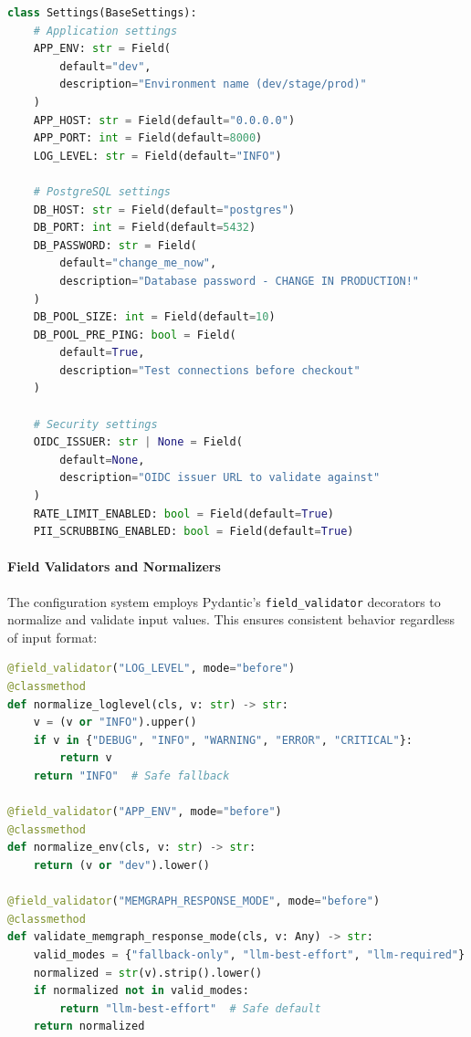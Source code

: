 \begin{lstlisting}[language=Python, caption=Example configuration field definitions from src/config.py]
class Settings(BaseSettings):
    # Application settings
    APP_ENV: str = Field(
        default="dev", 
        description="Environment name (dev/stage/prod)"
    )
    APP_HOST: str = Field(default="0.0.0.0")
    APP_PORT: int = Field(default=8000)
    LOG_LEVEL: str = Field(default="INFO")
    
    # PostgreSQL settings
    DB_HOST: str = Field(default="postgres")
    DB_PORT: int = Field(default=5432)
    DB_PASSWORD: str = Field(
        default="change_me_now", 
        description="Database password - CHANGE IN PRODUCTION!"
    )
    DB_POOL_SIZE: int = Field(default=10)
    DB_POOL_PRE_PING: bool = Field(
        default=True, 
        description="Test connections before checkout"
    )
    
    # Security settings
    OIDC_ISSUER: str | None = Field(
        default=None, 
        description="OIDC issuer URL to validate against"
    )
    RATE_LIMIT_ENABLED: bool = Field(default=True)
    PII_SCRUBBING_ENABLED: bool = Field(default=True)
\end{lstlisting}

\paragraph{Field Validators and Normalizers}
The configuration system employs Pydantic's \texttt{field\_validator} decorators to normalize and validate input values. This ensures consistent behavior regardless of input format:

\begin{lstlisting}[language=Python, caption=Configuration validators ensuring consistent values]
@field_validator("LOG_LEVEL", mode="before")
@classmethod
def normalize_loglevel(cls, v: str) -> str:
    v = (v or "INFO").upper()
    if v in {"DEBUG", "INFO", "WARNING", "ERROR", "CRITICAL"}:
        return v
    return "INFO"  # Safe fallback

@field_validator("APP_ENV", mode="before")
@classmethod
def normalize_env(cls, v: str) -> str:
    return (v or "dev").lower()

@field_validator("MEMGRAPH_RESPONSE_MODE", mode="before")
@classmethod
def validate_memgraph_response_mode(cls, v: Any) -> str:
    valid_modes = {"fallback-only", "llm-best-effort", "llm-required"}
    normalized = str(v).strip().lower()
    if normalized not in valid_modes:
        return "llm-best-effort"  # Safe default
    return normalized
\end{lstlisting}

